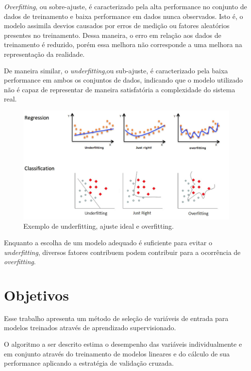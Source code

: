 \textit{Overfitting}, ou sobre-ajuste, é caracterizado pela alta performance no conjunto de dados de treinamento e baixa performance em dados nunca observados. Isto é, o modelo assimila desvios causados por erros de medição ou fatores aleatórios presentes no treinamento. Dessa maneira, o erro em relação aos dados de treinamento é reduzido, porém essa melhora não corresponde a uma melhora na representação da realidade.

De maneira similar, o \textit{underfitting},ou sub-ajuste, é caracterizado pela baixa performance em ambos os conjuntos de dados, indicando que o modelo utilizado não é capaz de representar de maneira satisfatória a complexidade do sistema real.

\begin{figure}[H]
    \caption{Exemplo de underfitting, ajuste ideal e overfitting.}
    \begin{center}
    \includegraphics[width=\linewidth]{imgs/intro/overfit}
    \end{center}
    \label{fig:mlflow}
\end{figure}


Enquanto a escolha de um modelo adequado é suficiente para evitar o \textit{underfitting}, diversos fatores contribuem podem contribuir para a ocorrência de \textit{overfitting}. 

\section{Objetivos}

Esse trabalho apresenta um método de seleção de variáveis de entrada para modelos treinados através de aprendizado supervisionado. 

O algoritmo a ser descrito estima o desempenho das variáveis individualmente e em conjunto através do treinamento de modelos lineares e do cálculo de sua performance aplicando a estratégia de validação cruzada.